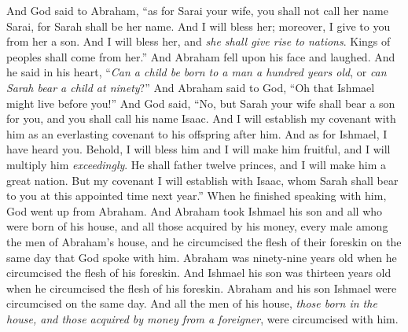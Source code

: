 \begin{biblechapter}
\verse And God said to Abraham, “as for Sarai your wife, you shall not call her name Sarai, for Sarah shall be her name.
\verse And I will bless her; moreover, I give to you from her a son. And I will bless her, and \textit{she shall give rise to nations}. Kings of peoples shall come from her.”
\verse And Abraham fell upon his face and laughed. And he said in his heart, “\textit{Can a child be born to a man a hundred years old}, or \textit{can Sarah bear a child at ninety}?”
\verse And Abraham said to God, “Oh that Ishmael might live before you!”
\verse And God said, “No, but Sarah your wife shall bear a son for you, and you shall call his name Isaac. And I will establish my covenant with him as an everlasting covenant to his offspring after him.
\verse And as for Ishmael, I have heard you. Behold, I will bless him and I will make him fruitful, and I will multiply him \textit{exceedingly}. He shall father twelve princes, and I will make him a great nation.
\verse But my covenant I will establish with Isaac, whom Sarah shall bear to you at this appointed time next year.”
\verse When he finished speaking with him, God went up from Abraham.
\verse And Abraham took Ishmael his son and all who were born of his house, and all those acquired by his money, every male among the men of Abraham’s house, and he circumcised the flesh of their foreskin on the same day that God spoke with him.
\verse Abraham was ninety-nine years old when he circumcised the flesh of his foreskin.
\verse And Ishmael his son was thirteen years old when he circumcised the flesh of his foreskin.
\verse Abraham and his son Ishmael were circumcised on the same day.
\verse And all the men of his house, \textit{those born in the house, and those acquired by money from a foreigner}, were circumcised with him.
\end{biblechapter}


